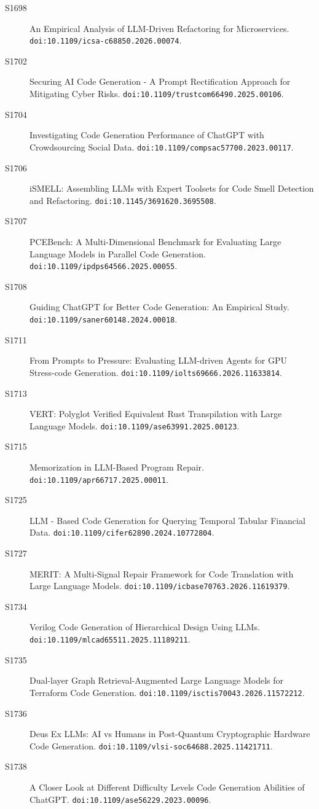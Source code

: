 {\begin{description}
\item[S1698] An Empirical Analysis of LLM-Driven Refactoring for Microservices. \texttt{doi:10.1109/icsa-c68850.2026.00074}.
\item[S1702] Securing AI Code Generation - A Prompt Rectification Approach for Mitigating Cyber Risks. \texttt{doi:10.1109/trustcom66490.2025.00106}.
\item[S1704] Investigating Code Generation Performance of ChatGPT with Crowdsourcing Social Data. \texttt{doi:10.1109/compsac57700.2023.00117}.
\item[S1706] iSMELL: Assembling LLMs with Expert Toolsets for Code Smell Detection and Refactoring. \texttt{doi:10.1145/3691620.3695508}.
\item[S1707] PCEBench: A Multi-Dimensional Benchmark for Evaluating Large Language Models in Parallel Code Generation. \texttt{doi:10.1109/ipdps64566.2025.00055}.
\item[S1708] Guiding ChatGPT for Better Code Generation: An Empirical Study. \texttt{doi:10.1109/saner60148.2024.00018}.
\item[S1711] From Prompts to Pressure: Evaluating LLM-driven Agents for GPU Stress-code Generation. \texttt{doi:10.1109/iolts69666.2026.11633814}.
\item[S1713] VERT: Polyglot Verified Equivalent Rust Transpilation with Large Language Models. \texttt{doi:10.1109/ase63991.2025.00123}.
\item[S1715] Memorization in LLM-Based Program Repair. \texttt{doi:10.1109/apr66717.2025.00011}.
\item[S1725] LLM - Based Code Generation for Querying Temporal Tabular Financial Data. \texttt{doi:10.1109/cifer62890.2024.10772804}.
\item[S1727] MERIT: A Multi-Signal Repair Framework for Code Translation with Large Language Models. \texttt{doi:10.1109/icbase70763.2026.11619379}.
\item[S1734] Verilog Code Generation of Hierarchical Design Using LLMs. \texttt{doi:10.1109/mlcad65511.2025.11189211}.
\item[S1735] Dual-layer Graph Retrieval-Augmented Large Language Models for Terraform Code Generation. \texttt{doi:10.1109/isctis70043.2026.11572212}.
\item[S1736] Deus Ex LLMs: AI vs Humans in Post-Quantum Cryptographic Hardware Code Generation. \texttt{doi:10.1109/vlsi-soc64688.2025.11421711}.
\item[S1738] A Closer Look at Different Difficulty Levels Code Generation Abilities of ChatGPT. \texttt{doi:10.1109/ase56229.2023.00096}.

\end{description}}
